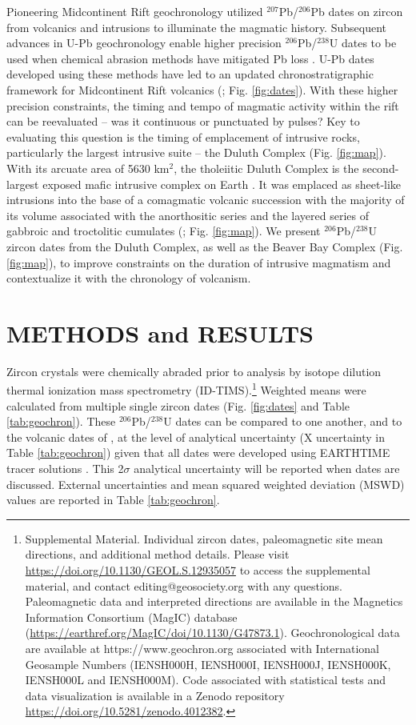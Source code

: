 \documentclass[11pt,letterpaper]{article}
\begin{document}
Pioneering Midcontinent Rift geochronology utilized $^{207}$Pb/$^{206}$Pb dates on zircon from volcanics \citep{Davis1997a} and intrusions \citep{Paces1993a} to illuminate the magmatic history. Subsequent advances in U-Pb geochronology enable higher precision $^{206}$Pb/$^{238}$U dates to be used when chemical abrasion methods have mitigated Pb loss \citep{Mattinson2005a}.  U-Pb dates developed using these methods have led to an updated chronostratigraphic framework for Midcontinent Rift volcanics (\citealp{Swanson-Hysell2019a}; Fig. \ref{fig:dates}). With these higher precision constraints, the timing and tempo of magmatic activity within the rift can be reevaluated -- was it continuous or punctuated by pulses? Key to evaluating this question is the timing of emplacement of intrusive rocks, particularly the largest intrusive suite -- the Duluth Complex (Fig. \ref{fig:map}). With its arcuate area of 5630 km$^2$, the tholeiitic Duluth Complex is the second-largest exposed mafic intrusive complex on Earth \citep{Miller2002c}. It was emplaced as sheet-like intrusions into the base of a comagmatic volcanic succession with the majority of its volume associated with the anorthositic series and the layered series of gabbroic and troctolitic cumulates (\citealp{Miller2002c}; Fig. \ref{fig:map}). We present $^{206}$Pb/$^{238}$U zircon dates from the Duluth Complex, as well as the Beaver Bay Complex (Fig. \ref{fig:map}), to improve constraints on the duration of intrusive magmatism and contextualize it with the chronology of volcanism.

\section*{METHODS and RESULTS}

Zircon crystals were chemically abraded prior to analysis by isotope dilution thermal ionization mass spectrometry (ID-TIMS).\footnote{Supplemental Material. Individual zircon dates, paleomagnetic site mean directions, and additional method details. Please visit \url{https://doi.org/10.1130/GEOL.S.12935057} to access the supplemental material, and contact editing@geosociety.org with any questions. Paleomagnetic data and interpreted directions are available in the Magnetics Information Consortium (MagIC) database (\url{https://earthref.org/MagIC/doi/10.1130/G47873.1}). Geochronological data are available at https://www.geochron.org associated with International Geosample Numbers (IENSH000H, IENSH000I, IENSH000J, IENSH000K, IENSH000L and IENSH000M). Code associated with statistical tests and data visualization is available in a Zenodo repository \url{https://doi.org/10.5281/zenodo.4012382}.} Weighted means were calculated from multiple single zircon dates (Fig. \ref{fig:dates} and Table \ref{tab:geochron}). These $^{206}$Pb/$^{238}$U dates can be compared to one another, and to the volcanic dates of \cite{Swanson-Hysell2019a}, at the level of analytical uncertainty (X uncertainty in Table \ref{tab:geochron}) given that all dates were developed using EARTHTIME tracer solutions \citep{Condon2015a}. This 2$\sigma$ analytical uncertainty will be reported when dates are discussed. External uncertainties and mean squared weighted deviation (MSWD) values are reported in Table \ref{tab:geochron}.
\end{document}
